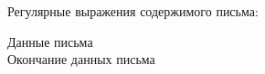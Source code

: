\documentclass[a4paper,12pt]{report}
\begin{document}
Регулярные выражения содержимого письма:
\begin{description}
    \item[Данные письма]
    
    \item[Окончание данных письма]
    
\end{description}


%
% 

%
%
%
%
%
%
%
%
%
%
%
%
\end{document}
